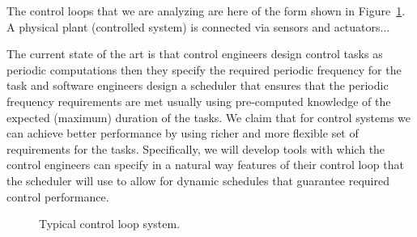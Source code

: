 \documentclass[11pt]{article}
\begin{document}
%	

The control loops that we are analyzing are here of the form shown in Figure~\ref{fig:control loop}. A physical plant (controlled system) is connected via sensors and actuators... %

The current state of the art is that control engineers design control tasks as periodic computations then they specify the required periodic frequency for the task and software engineers design a scheduler that ensures that the periodic frequency requirements are met usually using pre-computed knowledge of the expected (maximum) duration of the tasks.
We claim that for control systems we can achieve better performance by using richer and more flexible set of requirements for the tasks. Specifically, we will develop tools with which the control engineers can specify in a natural way features of their control loop that the scheduler will use to allow for dynamic schedules that guarantee required control performance. 

\begin{figure}[]
    \centering
    
    
    \caption{Typical control loop system.
    \label{fig:control loop}}
\end{figure}
\end{document}
